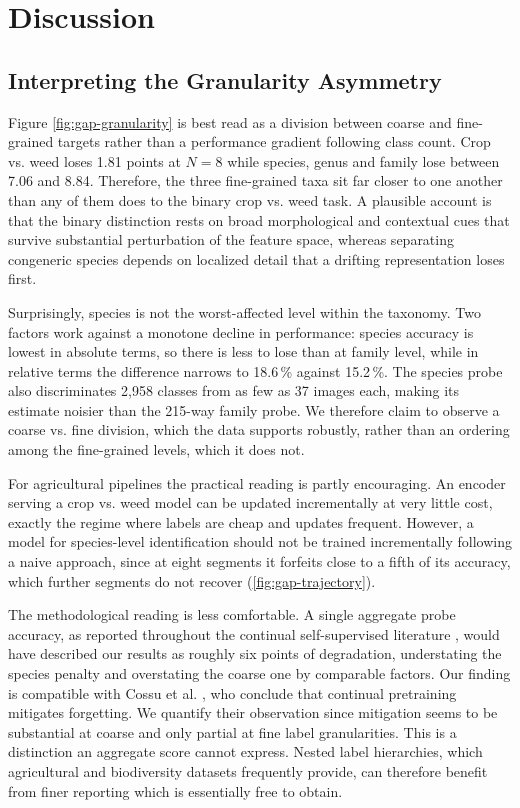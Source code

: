 \documentclass[english]{lni}
\begin{document}
\section{Discussion}\label{sec:discussion}

\subsection{Interpreting the Granularity Asymmetry}

Figure \ref{fig:gap-granularity} is best read as a division between coarse and fine-grained targets rather than a performance gradient following class count. Crop vs. weed loses 1.81 points at $N=8$ while species, genus and family lose between 7.06 and 8.84. Therefore, the three fine-grained taxa sit far closer to one another than any of them does to the binary crop vs. weed task. A plausible account is that the binary distinction rests on broad morphological and contextual cues that survive substantial perturbation of the feature space, whereas separating congeneric species depends on localized detail \cite{Wei2022} that a drifting representation loses first.

Surprisingly, species is not the worst-affected level within the taxonomy. Two factors work against a monotone decline in performance: species accuracy is lowest in absolute terms, so there is less to lose than at family level, while in relative terms the difference narrows to 18.6\,\% against 15.2\,\%. The species probe also discriminates 2,958 classes from as few as 37 images each, making its estimate noisier than the 215-way family probe. We therefore claim to observe a coarse vs. fine division, which the data supports robustly, rather than an ordering among the fine-grained levels, which it does not.

For agricultural pipelines the practical reading is partly encouraging. An encoder serving a crop vs. weed model can be updated incrementally at very little cost, exactly the regime where labels are cheap and updates frequent. However, a model for species-level identification should not be trained incrementally following a naive approach, since at eight segments it forfeits close to a fifth of its accuracy, which further segments do not recover (\cref{fig:gap-trajectory}).

The methodological reading is less comfortable. A single aggregate probe accuracy, as reported throughout the continual self-supervised literature \cite{Fini2022,Purushwalkam2022,Madaan2022}, would have described our results as roughly six points of degradation, understating the species penalty and overstating the coarse one by comparable factors. Our finding is compatible with Cossu et al. \cite{Cossu2024}, who conclude that continual pretraining mitigates forgetting. We quantify their observation since mitigation seems to be substantial at coarse and only partial at fine label granularities. This is a distinction an aggregate score cannot express. Nested label hierarchies, which agricultural and biodiversity datasets frequently provide, can therefore benefit from finer reporting which is essentially free to obtain.
\end{document}
